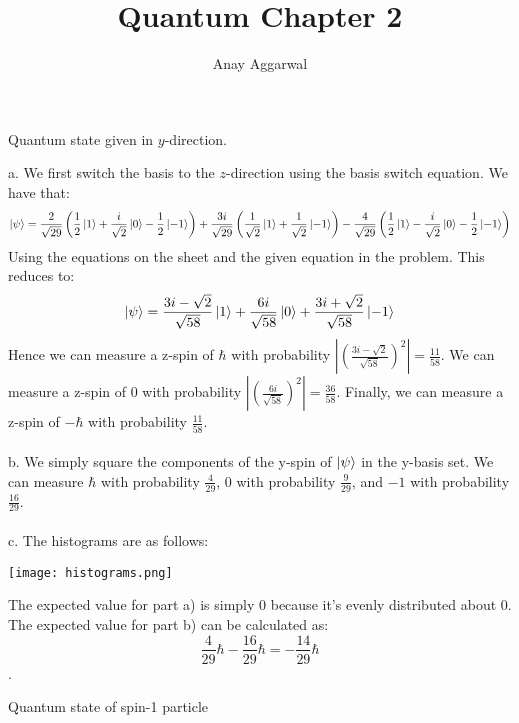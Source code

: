 \documentclass[11pt]{scrartcl}
\title{Quantum Chapter 2}
\author{Anay Aggarwal}
\begin{document}
\maketitle
\begin{example}
  [2.16]
  Quantum state given in $y$-direction.
\end{example}
\begin{soln}
  a. We first switch the basis to the $z$-direction using the basis switch equation.
  We have that:
  $$\Ket{\psi}=\frac{2}{\sqrt{29}}\left(\frac{1}{2}\Ket{1}+\frac{i}{\sqrt{2}}\Ket{0}-\frac{1}{2}\Ket{-1}\right)+\frac{3i}{\sqrt{29}}\left(\frac{1}{\sqrt{2}}\Ket{1}+\frac{1}{\sqrt{2}}\Ket{-1}\right)-\frac{4}{\sqrt{29}}\left(\frac{1}{2}\Ket{1}-\frac{i}{\sqrt{2}}\Ket{0}-\frac{1}{2}\Ket{-1}\right)$$
  Using the equations on the sheet and the given equation in the problem. This reduces to:
  $$\Ket{\psi}=\frac{3i-\sqrt{2}}{\sqrt{58}}\Ket{1}+\frac{6i}{\sqrt{58}}\Ket{0}+\frac{3i+\sqrt{2}}{\sqrt{58}}\Ket{-1}$$
  Hence we can measure a z-spin of $\hbar$ with probability $\left|\left(\frac{3i-\sqrt{2}}{\sqrt{58}}\right)^2\right|=\frac{11}{58}$.
  We can measure a z-spin of $0$ with probability $\left|\left(\frac{6i}{\sqrt{58}}\right)^2\right|=\frac{36}{58}$.
  Finally,  we can measure a z-spin of $-\hbar$ with probability $\frac{11}{58}$.
  \\ \\
  b. We simply square the components of the y-spin of $\Ket{\psi}$ in the y-basis set. We can measure $\hbar$ with probability $\frac{4}{29}$, $0$ with probability $\frac{9}{29}$,
  and $-1$ with probability $\frac{16}{29}$.
  \\ \\
  c. The histograms are as follows:
  \begin{center}\texttt{[image: histograms.png]}\end{center}
  The expected value for part a) is simply $0$ because it's evenly distributed about $0$. The expected value for part b) can be calculated as:
  $$\frac{4}{29}\hbar-\frac{16}{29}\hbar=-\frac{14}{29}\hbar$$.
\end{soln}
\begin{example}
  [2.17]
  Quantum state of spin-1 particle
\end{example}
\end{document}
